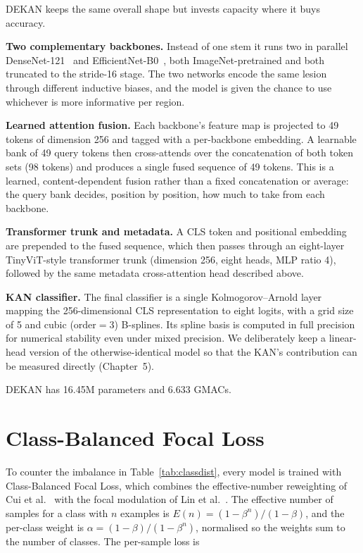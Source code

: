 DEKAN keeps the same overall shape but invests capacity where it buys accuracy.

\textbf{Two complementary backbones.} Instead of one stem it runs two in
parallel DenseNet-121~\cite{huang2017densenet} and
EfficientNet-B0~\cite{tan2019efficientnet}, both ImageNet-pretrained and both
truncated to the stride-16 stage. The two networks encode the same lesion through
different inductive biases, and the model is given the chance to use whichever is
more informative per region.

\textbf{Learned attention fusion.} Each backbone's feature map is projected to
49 tokens of dimension 256 and tagged with a per-backbone embedding. A learnable
bank of 49 query tokens then cross-attends over the concatenation of both token
sets (98 tokens) and produces a single fused sequence of 49 tokens. This is a
learned, content-dependent fusion rather than a fixed concatenation or average:
the query bank decides, position by position, how much to take from each
backbone.

\textbf{Transformer trunk and metadata.} A CLS token and positional embedding are
prepended to the fused sequence, which then passes through an eight-layer
TinyViT-style transformer trunk (dimension 256, eight heads, MLP ratio 4),
followed by the same metadata cross-attention head described above.

\textbf{KAN classifier.} The final classifier is a single Kolmogorov--Arnold
layer~\cite{liu2024kan} mapping the 256-dimensional CLS representation to eight
logits, with a grid size of 5 and cubic ($\text{order}=3$) B-splines. Its spline
basis is computed in full precision for numerical stability even under mixed
precision. We deliberately keep a linear-head version of the otherwise-identical
model so that the KAN's contribution can be measured directly (Chapter~5).

DEKAN has 16.45M parameters and 6.633 GMACs.

\section{Class-Balanced Focal Loss}

To counter the imbalance in Table~\ref{tab:classdist}, every model is trained
with Class-Balanced Focal Loss, which combines the effective-number reweighting
of Cui et al.~\cite{cui2019classbalanced} with the focal modulation of Lin et
al.~\cite{lin2017focal}. The effective number of samples for a class with $n$
examples is $E(n) = (1-\beta^{n})/(1-\beta)$, and the per-class weight is
$\alpha = (1-\beta)/(1-\beta^{n})$, normalised so the weights sum to the number
of classes. The per-sample loss is

